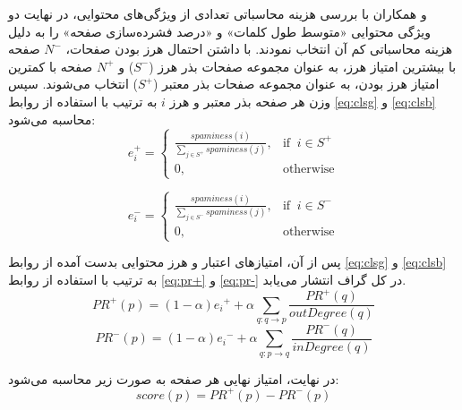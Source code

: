 \documentclass[twoside, a4paper,11pt]{book}
\numberwithin{equation}{chapter}
\numberwithin{table}{chapter}
\numberwithin{figure}{chapter}
\numberwithin{equation}{chapter}
\begin{document}
 و همکاران \cite{polar2012} با بررسی هزینه محاسباتی تعدادی از ویژگی‌های محتوایی، در نهایت دو ویژگی محتوایی «متوسط طول کلمات» و «درصد فشرده‌سازی صفحه» را به دلیل هزینه محاسباتی کم آن انتخاب نمودند. با داشتن احتمال هرز بودن صفحات، $N^-$ صفحه با بیشترین امتیاز هرز، به عنوان مجموعه صفحات بذر هرز ($S^-$) و $N^+$ صفحه با کمترین امتیاز هرز بودن، به عنوان مجموعه صفحات بذر معتبر ($S^+$) انتخاب می‌شوند. سپس وزن هر صفحه بذر معتبر و هرز $i$ به ترتیب با استفاده از روابط \ref{eq:clsg} و \ref{eq:clsb} محاسبه می‌شود:
\begin{equation}
\label{eq:clsg}
  e_i^+=\begin{cases}
     \frac{spaminess(i)}{\sum_{j \in S^+} spaminess(j)},& \text{if} \; \;  i \in S^+\\
    0, & \text{otherwise}
  \end{cases}
\end{equation}

\begin{equation}
\label{eq:clsb}
  e_i^-=\begin{cases}
     \frac{spaminess(i)}{\sum_{j \in S^-} spaminess(j)},& \text{if} \; \;  i \in S^-\\
    0, & \text{otherwise}
  \end{cases}
\end{equation}

پس از آن، امتیازهای اعتبار و هرز محتوایی بدست آمده از روابط \ref{eq:clsg} و \ref{eq:clsb} به ترتیب با استفاده از روابط \ref{eq:pr+} و \ref{eq:pr-} در کل گراف انتشار می‌یابد.
\begin{equation}
\label{eq:pr+}
PR^+(p) = (1-\alpha) {e_i}^+ + \alpha \sum_{q: q\rightarrow p} \frac{PR^+(q)}{outDegree(q)}  
\end{equation}
\begin{equation}
\label{eq:pr-}
 PR^-(p) = (1-\alpha) {e_i}^- + \alpha \sum_{q: p\rightarrow q} \frac{PR^-(q)}{inDegree(q)}   
\end{equation}

در نهایت، امتیاز نهایی هر صفحه به صورت زیر محاسبه می‌شود:
\begin{equation}
\label{eq:pr+-}
 score(p) = PR^+(p) - PR^-(p)
\end{equation}
\end{document}
